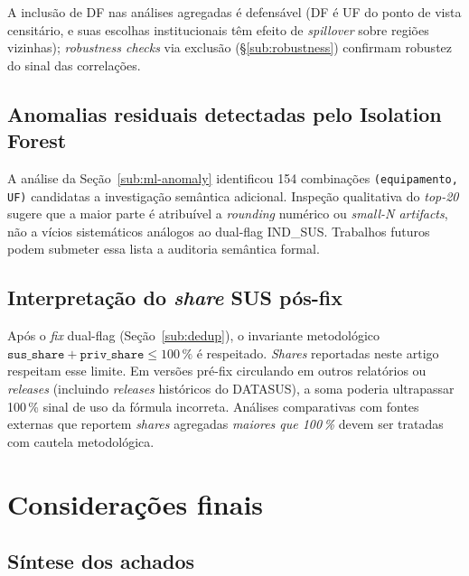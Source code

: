 \documentclass[12pt,a4paper,oneside]{article}
\begin{document}
A inclusão de DF nas análises agregadas é defensável (DF é UF
do ponto de vista censitário, e suas escolhas institucionais
têm efeito de \textit{spillover} sobre regiões vizinhas);
\textit{robustness checks} via exclusão (§\ref{sub:robustness})
confirmam robustez do sinal das correlações.

\subsection{Anomalias residuais detectadas pelo Isolation
Forest}\label{sub:caveat-anomalias}

A análise da Seção~\ref{sub:ml-anomaly} identificou 154
combinações \texttt{(equipamento, UF)} candidatas a investigação
semântica adicional. Inspeção qualitativa do \textit{top-20}
sugere que a maior parte é atribuível a \textit{rounding}
numérico ou \textit{small-N artifacts}, não a vícios sistemáticos
análogos ao dual-flag IND\_SUS. Trabalhos futuros podem submeter
essa lista a auditoria semântica formal.

\subsection{Interpretação do \textit{share} SUS pós-fix}\label{sub:caveat-share-sus}

Após o \textit{fix} dual-flag (Seção~\ref{sub:dedup}), o
invariante metodológico
$\texttt{sus\_share} + \texttt{priv\_share} \leq 100\,\%$ é
respeitado. \textit{Shares} reportadas neste artigo respeitam
esse limite. Em versões pré-fix circulando em outros relatórios
ou \textit{releases} (incluindo \textit{releases} históricos do
DATASUS), a soma poderia ultrapassar 100\,\% \textemdash{} sinal
de uso da fórmula incorreta. Análises comparativas com fontes
externas que reportem \textit{shares} agregadas
\textit{maiores que 100\,\%} devem ser tratadas com cautela
metodológica.

\section{Considerações finais}\label{sec:conclusao}

\subsection{Síntese dos achados}
\end{document}
